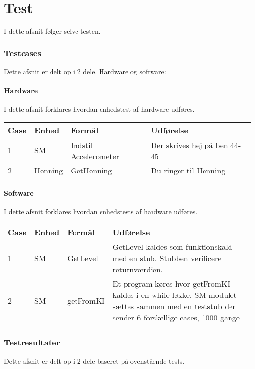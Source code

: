 \chapter{Test}
I dette afsnit følger selve testen.
\subsection{Testcases}
Dette afsnit er delt op i  2 dele. Hardware og software:\\
\subsubsection{Hardware}
I dette afsnit forklares hvordan enhedstest af hardware udføres.
\begin{table}[htbp]
\centering
\begin{tabular}{| p{1.5cm}  | p{3cm} | p{4.5cm} | p{4.5cm} |}
\hline
Case &Enhed &Formål &Udførelse\\\hline
1 &SM &Indstil Accelerometer &Der skrives hej på ben 44-45\\\hline
2 &Henning &GetHenning &Du ringer til Henning\\\hline
\end{tabular}
\end{table}
\subsubsection{Software}
I dette afsnit forklares hvordan enhedstests af hardware udføres.
\begin{table}[htbp]
\centering
\begin{tabular}{| p{1.5cm}  | p{3cm} | p{4.5cm} | p{4.5cm} |}
\hline
Case &Enhed &Formål &Udførelse\\\hline
1 &SM &GetLevel &GetLevel kaldes som funktionskald med en stub. Stubben verificere returnværdien.\\\hline
2 &SM &getFromKI &Et program køres hvor getFromKI kaldes i en while løkke. SM modulet sættes sammen med en teststub der sender 6 forskellige cases, 1000 gange.\\\hline
\end{tabular}
\end{table}
\subsection{Testresultater}
Dette afsnit er delt op i  2 dele baseret på ovenstående tests.\\
